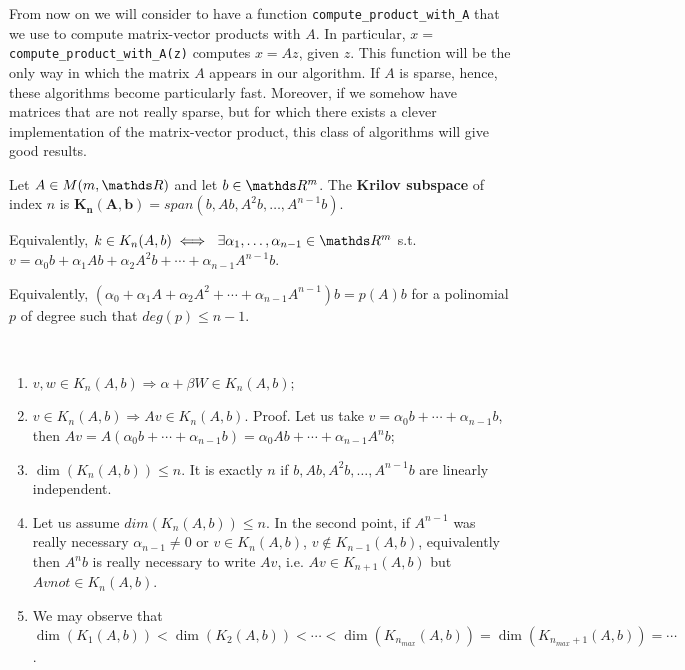 \documentclass[computationalMathematics.tex]{subfiles}
\begin{document}
  From now on we will consider to have a function \texttt{compute\_product\_with\_A} that we use to compute matrix-vector products with $A$. In particular, $x=$\texttt{compute\_product\_with\_A(z)} computes $x =Az$, given $z$. This function will be the only way in which the matrix $A$ appears in our algorithm. If $A$ is sparse, hence, these algorithms become particularly fast. Moreover, if we somehow have matrices that are not really sparse, but for which there exists a clever implementation of the matrix-vector product, this class of algorithms will give good results.

\begin{definition}
  Let $A \in M(m, \R)$ and let $b \in \R^m$. The \textbf{Krilov subspace} of index $n$ is $\mathbf{K_n(A, b)} = span(b, Ab, A^2b, \ldots, A^{n-1}b)$.
  
  Equivalently, $k \in K_n(A, b) \iff ~ \exists \alpha_1, \ldots, \alpha_{n-1} \in \R^m$ s.t. $v= \alpha_0 b + \alpha_1 Ab + \alpha_2 A^2b + \cdots + \alpha_{n-1} A^{n-1}b$.
  
  Equivalently, $(\alpha_0 + \alpha_1A + \alpha_2A^2 + \cdots + \alpha_{n-1} A^{n-1}) b = p(A) b$ for a polinomial $p$ of degree such that $deg(p) \le n-1$.
\end{definition}

\begin{obs}[Properties]~\\
  \begin{enumerate}
    \item $v, w \in K_n(A, b) \Rightarrow \alpha + \beta W \in K_n(A, b)$;
    \item $v \in {K}_{n}(A, b) \Rightarrow Av \in {K}_{n}(A, b)$. Proof. Let us take $v = {\alpha}_{0} b + \cdots + {\alpha}_{n-1} b$, then $Av = A({\alpha}_{0} b + \cdots + {\alpha}_{n-1}b) = {\alpha}_0 Ab + \cdots + {\alpha}_{n-1} {A}^{n}b$;
    \item $\dim(K_n(A, b)) \le n$. It is exactly $n$ if $b, Ab, A^2 b, \ldots, A^{n-1} b$ are linearly independent.
    \item Let us assume $dim(K_n(A, b)) \le n$. In the second point, if $A^{n-1}$ was really necessary ${\alpha}_{n-1} \neq 0$ or $v \in {K}_{n}(A, b)$, $v \notin {K}_{n-1}(A, b)$, equivalently then ${A}^{n}b$ is really necessary to write $Av$, i.e. $Av \in {K}_{n+1}(A, b)$ but $Av not \in {K}_{n}(A, b)$.
    \item We may observe that $\dim({K}_{1} (A, b)) < \dim({K}_{2}(A, b)) < \cdots < \dim({K}_{n_{max}}(A, b)) = \dim({K}_{n_{max} + 1}(A, b)) = \cdots$.
  \end{enumerate}
  \end{obs}
\end{document}
